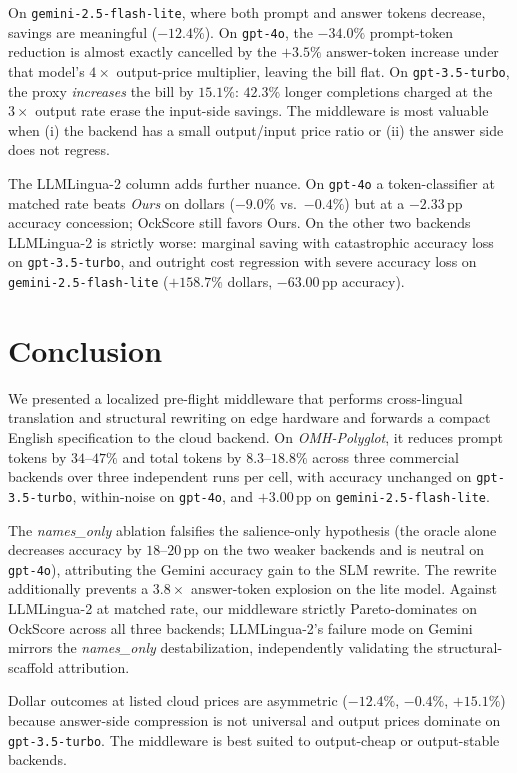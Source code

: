 \documentclass[11pt,a4paper,twocolumn]{article}
\begin{document}
On \texttt{gemini-2.5-flash-lite}, where both prompt and answer tokens decrease, savings are meaningful ($-12.4\%$). On \texttt{gpt-4o}, the $-34.0\%$ prompt-token reduction is almost exactly cancelled by the $+3.5\%$ answer-token increase under that model's $4\times$ output-price multiplier, leaving the bill flat. On \texttt{gpt-3.5-turbo}, the proxy \textit{increases} the bill by $15.1\%$: $42.3\%$ longer completions charged at the $3\times$ output rate erase the input-side savings. The middleware is most valuable when (i) the backend has a small output/input price ratio or (ii) the answer side does not regress.

The LLMLingua-2 column adds further nuance. On \texttt{gpt-4o} a token-classifier at matched rate beats \textit{Ours} on dollars ($-9.0\%$ vs.\ $-0.4\%$) but at a $-2.33$\,pp accuracy concession; OckScore still favors Ours. On the other two backends LLMLingua-2 is strictly worse: marginal saving with catastrophic accuracy loss on \texttt{gpt-3.5-turbo}, and outright cost regression with severe accuracy loss on \texttt{gemini-2.5-flash-lite} ($+158.7\%$ dollars, $-63.00$\,pp accuracy).

\section{Conclusion}
\label{sec:conclusion}
We presented a localized pre-flight middleware that performs cross-lingual translation and structural rewriting on edge hardware and forwards a compact English specification to the cloud backend. On \textit{OMH-Polyglot}, it reduces prompt tokens by $34$--$47\%$ and total tokens by $8.3$--$18.8\%$ across three commercial backends over three independent runs per cell, with accuracy unchanged on \texttt{gpt-3.5-turbo}, within-noise on \texttt{gpt-4o}, and $+3.00$\,pp on \texttt{gemini-2.5-flash-lite}.

The \textit{names\_only} ablation falsifies the salience-only hypothesis (the oracle alone decreases accuracy by $18$--$20$\,pp on the two weaker backends and is neutral on \texttt{gpt-4o}), attributing the Gemini accuracy gain to the SLM rewrite. The rewrite additionally prevents a $3.8\times$ answer-token explosion on the lite model. Against LLMLingua-2 at matched rate, our middleware strictly Pareto-dominates on OckScore across all three backends; LLMLingua-2's failure mode on Gemini mirrors the \textit{names\_only} destabilization, independently validating the structural-scaffold attribution.

Dollar outcomes at listed cloud prices are asymmetric ($-12.4\%$, $-0.4\%$, $+15.1\%$) because answer-side compression is not universal and output prices dominate on \texttt{gpt-3.5-turbo}. The middleware is best suited to output-cheap or output-stable backends.
\end{document}
